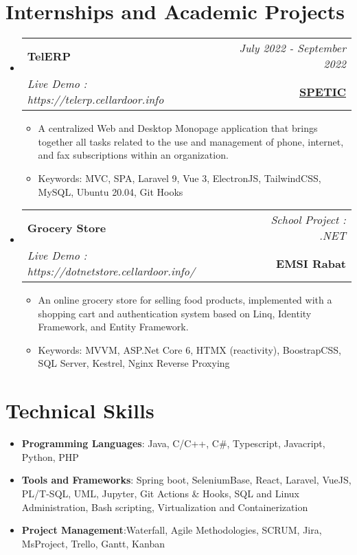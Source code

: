 \documentclass[a4paper,11pt]{article}
\makeatletter
\newcommand{\resumeItem}[2]{
  \item{
    \textbf{#1}{:\hspace{0.5mm}#2 \vspace{-0.5mm}}
  }
}
\newcommand{\resumeProject}[4]{
\vspace{0.5mm}\item
    \begin{tabular*}{0.98\textwidth}[t]{l@{\extracolsep{\fill}}r}
        \textbf{#1} & \textit{\footnotesize{#3}} \\
        \footnotesize{\textit{#2}} & \footnotesize{#4}
    \end{tabular*}
    \vspace{-2.4mm}
}
\newcommand{\resumeSubItem}[2]{\resumeItem{#1}{#2}\vspace{-4pt}}
\newcommand{\resumeSubHeadingListStart}{\begin{itemize}[leftmargin=*,labelsep=0mm]}
\newcommand{\resumeHeadingSkillStart}{\begin{itemize}[leftmargin=*,itemsep=1.7mm, rightmargin=2ex]}
\newcommand{\resumeItemListStart}{\begin{justify}\begin{itemize}[leftmargin=3ex, rightmargin=2ex, noitemsep,labelsep=1.2mm,itemsep=0mm]\small}
\newcommand{\resumeSubHeadingListEnd}{\end{itemize}\vspace{2mm}}
\newcommand{\resumeHeadingSkillEnd}{\end{itemize}\vspace{-2mm}}
\newcommand{\resumeItemListEnd}{\end{itemize}\end{justify}\vspace{-2mm}}
\makeatother
\begin{document}
\section{\textbf{Internships and Academic Projects}}
\resumeSubHeadingListStart 
    \resumeProject
      {TelERP} 
      {Live Demo : https://telerp.cellardoor.info} 
      {July 2022 - September 2022} 
      {\href{https://telerp.cellardoor.info}{\textbf{SPETIC}}} 
        \vspace{-2mm}
      \resumeItemListStart
        \item {A centralized Web and Desktop Monopage application that brings together all tasks related to the use and management of phone, internet, and fax subscriptions within an organization.}
        \item {Keywords: MVC, SPA, Laravel 9, Vue 3, ElectronJS, TailwindCSS, MySQL, Ubuntu 20.04, Git Hooks}
      \resumeItemListEnd
      \vspace{-3mm}
    \resumeProject
      {Grocery Store} 
    {Live Demo : https://dotnetstore.cellardoor.info/} 
      {School Project : .NET} 
      {{\textbf{EMSI Rabat}}} 
    \vspace{-2mm}
      \resumeItemListStart
        \item {An online grocery store for selling food products, implemented with a shopping cart and authentication system based on Linq, Identity Framework, and Entity Framework.}
        \item {Keywords: MVVM, ASP.Net Core 6, HTMX (reactivity), BoostrapCSS, SQL Server, Kestrel, Nginx Reverse Proxying}
      \resumeItemListEnd
     \vspace{-2mm}
\resumeSubHeadingListEnd
\vspace{-7mm}

\section{\textbf{Technical Skills}}
 \resumeHeadingSkillStart
  \resumeSubItem{Programming Languages} 
    { Java, C/C++, C\#, Typescript, Javacript, Python, PHP}
    \vspace{-0.5mm} 
 \resumeSubItem{Tools and Frameworks} 
    { Spring boot, SeleniumBase, React, Laravel, VueJS, PL/T-SQL, UML, Jupyter, Git Actions \& Hooks, SQL and Linux Administration, Bash scripting, Virtualization and Containerization} 
    \vspace{-0.5mm}
\resumeSubItem{Project Management} 
    {Waterfall, Agile Methodologies, SCRUM, Jira, MsProject, Trello, Gantt, Kanban} 
    \vspace{-0.5mm} 
 \resumeHeadingSkillEnd
\vspace{-2mm}
\end{document}
